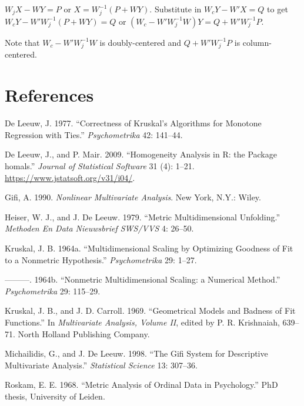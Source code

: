 \documentclass[
  12pt,
]{article}
\newlength{\cslhangindent}
\newenvironment{CSLReferences}[2] %
 {\begin{list}{}{%
  \setlength{\itemindent}{0pt}
  \setlength{\leftmargin}{0pt}
  \setlength{\parsep}{0pt}
  \ifodd #1
   \setlength{\leftmargin}{\cslhangindent}
   \setlength{\itemindent}{-1\cslhangindent}
  \fi
  \setlength{\itemsep}{#2\baselineskip}}}
 {\end{list}}
\begin{document}
\(W_jX-WY=P\) or \(X=W_j^{-1}(P+WY)\). Substitute in \(W_cY-W'X=Q\)
to get \(W_cY-W'W_j^{-1}(P+WY)=Q\) or \((W_c-W'W_j^{-1}W)Y=Q+W'W_j^{-1}P\).

Note that \(W_c-W'W_j^{-1}W\) is doubly-centered and \(Q+W'W_j^{-1}P\) is column-centered.

\section*{References}\label{references}

\label{refs}
\begin{CSLReferences}{1}{0}
De Leeuw, J. 1977. {``Correctness of Kruskal's Algorithms for Monotone Regression with Ties.''} \emph{Psychometrika} 42: 141--44.

De Leeuw, J., and P. Mair. 2009. {``{Homogeneity Analysis in {R}: the Package homals}.''} \emph{Journal of Statistical Software} 31 (4): 1--21. \url{https://www.jstatsoft.org/v31/i04/}.

Gifi, A. 1990. \emph{Nonlinear Multivariate Analysis}. New York, N.Y.: Wiley.

Heiser, W. J., and J. De Leeuw. 1979. {``Metric Multidimensional Unfolding.''} \emph{Methoden En Data Nieuwsbrief SWS/VVS} 4: 26--50.

Kruskal, J. B. 1964a. {``{Multidimensional Scaling by Optimizing Goodness of Fit to a Nonmetric Hypothesis}.''} \emph{Psychometrika} 29: 1--27.

---------. 1964b. {``{Nonmetric Multidimensional Scaling: a Numerical Method}.''} \emph{Psychometrika} 29: 115--29.

Kruskal, J. B., and J. D. Carroll. 1969. {``{Geometrical Models and Badness of Fit Functions}.''} In \emph{Multivariate Analysis, Volume II}, edited by P. R. Krishnaiah, 639--71. North Holland Publishing Company.

Michailidis, G., and J. De Leeuw. 1998. {``The Gifi System for Descriptive Multivariate Analysis.''} \emph{Statistical Science} 13: 307--36.

Roskam, E. E. 1968. {``{Metric Analysis of Ordinal Data in Psychology}.''} PhD thesis, University of Leiden.

\end{CSLReferences}
\end{document}
